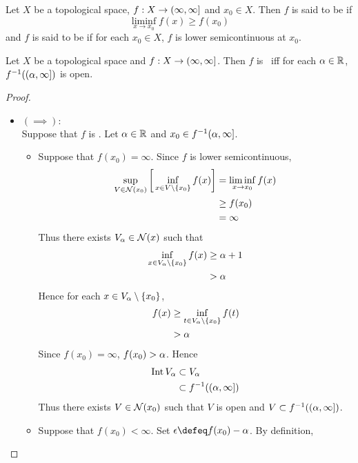 \documentclass{book}
\begin{document}
	\begin{defn} \ld{}
	Let $X$ be a topological space, $f: X \rightarrow (\infty, \infty]$ and $x_0 \in X$. Then $f$ is said to be  if $$\liminf_{x \rightarrow x_0}f(x) \geq f(x_0)$$ and $f$ is said to be  if for each $x_0 \in X$, $f$ is lower semicontinuous at $x_0$. 
	\end{defn}
	
	\begin{ex} \lex{}
	Let $X$ be a topological space and $f: X \rightarrow (\infty, \infty]$. Then $f$ is \lsc\ iff for each $\alpha \in \mathbb{R}$, $f^{-1}((\alpha, \infty])$ is open. 
	\end{ex}
	
	\begin{proof}\
	\begin{itemize}
		\item $(\implies):$ \\
		Suppose that $f$ is \lsc. Let $\alpha \in \mathbb{R}$ and $x_0 \in f^{-1}(\alpha, \infty]$. 
		\begin{itemize}
			\item Suppose that $f(x_0) = \infty$. Since $f$ is lower semicontinuous, 
			\begin{align*}
				\sup_{V \in \mathcal{N}(x_0)} \bigg[ \inf_{x \in V\setminus \{x_0\} } f(x) \bigg] 
				& = \liminf_{x \rightarrow x_0} f(x) \\
				& \geq f(x_0) \\
				& = \infty
			\end{align*}
			Thus there exists $V_{\alpha} \in \mathcal{N}(x)$ such that 
			\begin{align*}
				\inf\limits_{x \in V_{\alpha} \setminus \{x_0\} } f(x) 
				& \geq \alpha + 1 \\
				& > \alpha 
			\end{align*}
			Hence for each $x \in V_{\alpha} \setminus \{x_0\}$,
			\begin{align*}
				f(x)
				& \geq \inf\limits_{t \in V_{\alpha} \setminus \{x_0\} } f(t) \\
				& > \alpha 
			\end{align*}
			Since $f(x_0) = \infty$, $f(x_0) > \alpha$. Hence  
			\begin{align*}
				\operatorname{Int} V_{\alpha} 
				& \subset V_{\alpha} \\
				& \subset f^{-1}((\alpha, \infty])
			\end{align*} 
			Thus there exists $V \in \mathcal{N}(x_0)$ such that $V$ is open and $V \subset f^{-1}((\alpha, \infty])$.
			\item Suppose that $f(x_0) < \infty$. Set $\ep \defeq f(x_0) - \al$. By definition,  

\end{itemize}
\end{itemize}
\end{proof}
\end{document}
